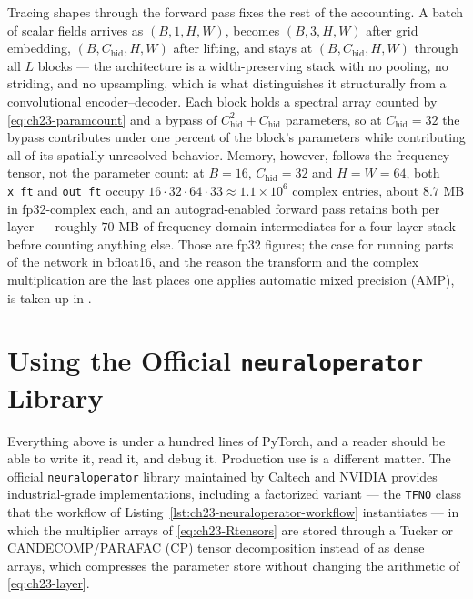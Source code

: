 Tracing shapes through the forward pass fixes the rest of the accounting. A batch
of scalar fields arrives as $(B, 1, H, W)$, becomes $(B, 3, H, W)$ after grid
embedding, $(B, C_{\text{hid}}, H, W)$ after lifting, and stays at
$(B, C_{\text{hid}}, H, W)$ through all $L$ blocks --- the architecture is a
width-preserving stack with no pooling, no striding, and no upsampling, which is
what distinguishes it structurally from a convolutional encoder--decoder.
Each block holds a spectral array counted by \eqref{eq:ch23-paramcount} and a
bypass of $C_{\text{hid}}^2 + C_{\text{hid}}$ parameters, so at
$C_{\text{hid}} = 32$
the bypass contributes under one percent of the block's parameters while
contributing all of its spatially unresolved behavior. Memory, however, follows
the frequency tensor, not the parameter count: at $B = 16$,
$C_{\text{hid}} = 32$ and $H = W = 64$, both \texttt{x\_ft} and
\texttt{out\_ft} occupy $16 \cdot 32 \cdot 64 \cdot 33 \approx 1.1 \times 10^{6}$
complex entries, about $8.7$ MB in fp32-complex each, and an autograd-enabled
forward pass retains both per layer --- roughly $70$ MB of frequency-domain
intermediates for a four-layer stack before counting anything else. Those are
fp32 figures; the case for running parts of the network in bfloat16, and the
reason the transform and the complex multiplication are the last places one
applies automatic mixed precision (AMP), is taken up in
.

\section{Using the Official \texttt{neuraloperator} Library}
\label{sec:ch23-library}

Everything above is under a hundred lines of PyTorch, and a reader should be
able to write it, read it, and debug it. Production use is a different matter.
The official \texttt{neuraloperator} library maintained by Caltech and NVIDIA
provides industrial-grade implementations, including a factorized variant --- the
\texttt{TFNO} class that the workflow of
Listing~\ref{lst:ch23-neuraloperator-workflow} instantiates --- in which the
multiplier arrays of \eqref{eq:ch23-Rtensors} are stored through a Tucker or
CANDECOMP/PARAFAC (CP) tensor decomposition instead of as dense arrays, which
compresses the parameter store without changing the arithmetic of
\eqref{eq:ch23-layer}.

